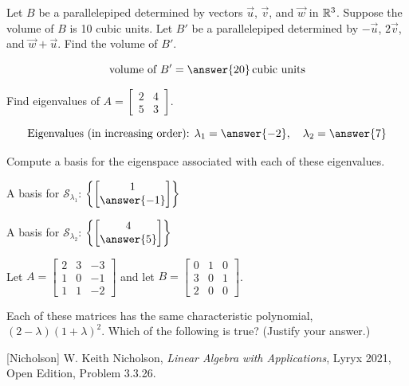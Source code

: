 \documentclass{ximera}
\begin{document}
\begin{exercise}
Let $B$ be a parallelepiped determined by vectors $\vec{u}$, $\vec{v}$, and $\vec{w}$ in $\mathbb{R}^3$.  Suppose the volume of $B$ is 10 cubic units.  Let $B'$ be a parallelepiped determined by $-\vec{u}$, $2\vec{v}$, and $\vec{w}+\vec{u}$.  Find the volume of $B'$.

$$\text{volume of }B' = \answer{20}\,\text{cubic units}$$


 \end{exercise}

\begin{exercise}
Find eigenvalues of $A=\begin{bmatrix} 2 & 4\\5 & 3\end{bmatrix}$.

$$\text{Eigenvalues (in increasing order): }\lambda_1=\answer{-2}, \quad\lambda_2=\answer{7}$$

Compute a basis for the eigenspace associated with each of these eigenvalues.

A basis for $\mathcal{S}_{\lambda_1}$: $\left\{\begin{bmatrix}1\\\answer{-1}\end{bmatrix}\right\}$

A basis for $\mathcal{S}_{\lambda_2}$: $\left\{\begin{bmatrix}4\\\answer{5}\end{bmatrix}\right\}$

 \end{exercise}

 \begin{exercise}
Let $A=\begin{bmatrix} 2 & 3 & -3 \\ 1 & 0 & -1 \\ 1 & 1 & -2 \end{bmatrix}$ and let $B=\begin{bmatrix} 0 & 1 & 0 \\ 3 & 0 & 1 \\ 2 & 0 & 0 \end{bmatrix}$.

Each of these matrices has the same characteristic polynomial, $(2-\lambda)(1+\lambda)^2$.  Which of the following is true?  (Justify your answer.)

 \begin{multipleChoice}
 \end{multipleChoice}

[Nicholson] W. Keith Nicholson, {\it Linear Algebra with Applications}, Lyryx 2021, Open Edition, Problem 3.3.26.
\end{exercise}
\end{document}
